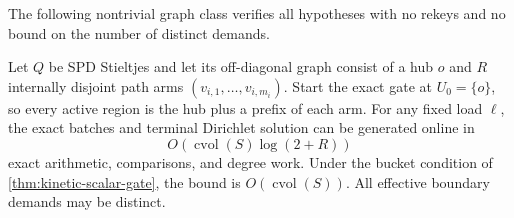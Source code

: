 The following nontrivial graph class verifies all hypotheses with no rekeys
and no bound on the number of distinct demands.

\begin{theorem}
\label{thm:rooted-spider-kinetic}
Let $Q$ be SPD Stieltjes and let its off-diagonal graph consist of a hub $o$
and $R$ internally disjoint path arms
$(v_{i,1},\ldots,v_{i,m_i})$.  Start the exact gate at $U_0=\{o\}$, so every
active region is the hub plus a prefix of each arm.  For any fixed load
$\ell$, the exact batches and terminal Dirichlet solution can be generated
online in
\begin{equation}
 O\!\left(\operatorname{cvol}(S)\log(2+R)\right)
 \label{eq:spider-work}
\end{equation}
exact arithmetic, comparisons, and degree work.  Under the bucket condition
of \cref{thm:kinetic-scalar-gate}, the bound is
$O(\operatorname{cvol}(S))$.  All effective boundary demands may be distinct.
\end{theorem}

